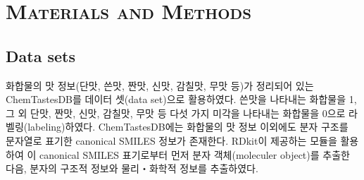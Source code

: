 \documentclass[9pt]{ieeeconf}
\begin{document}
\section[short]{\Large {\textsc{Materials and Methods}}}
\subsection[short]{\large {Data sets}}
화합물의 맛 정보(단맛, 쓴맛, 짠맛, 신맛, 감칠맛, 무맛 등)가 정리되어 있는 ChemTastesDB\cite{rojas2022chemtastesdb}를 데이터 셋(data set)으로 활용하였다. 쓴맛을 나타내는 화합물을 1, 그 외 단맛, 짠맛, 신맛, 감칠맛, 무맛 등 다섯 가지 미각을 나타내는 화합물을 0으로 라벨링(labeling)하였다. 
ChemTastesDB에는 화합물의 맛 정보 이외에도 분자 구조를 문자열로 표기한 canonical SMILES 정보가 존재한다. RDkit이 제공하는 모듈을 활용하여 이 canonical SMILES 표기로부터 먼저 분자 객체(moleculer object)를 추출한 다음, 분자의 구조적 정보와 물리‧화학적 정보를 추출하였다. 






\end{document}
